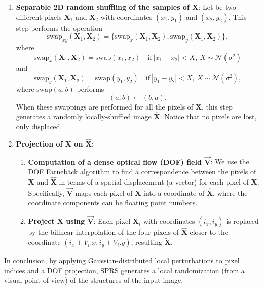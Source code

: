 \documentclass{article}
\begin{document}
\begin{enumerate}
\item \textbf{Separable 2D random shuffling of the samples of
    $\mathbf{X}$}: Let be two different pixels $\mathbf{X}_1$ and
  $\mathbf{X}_2$ with coordinates $(x_1, y_1)$ and $(x_2, y_2)$. This
  step performs the operation
  \begin{equation}
    \text{swap}_{xy}(\mathbf{X}_1,\mathbf{X}_2) = \{\text{swap}_x(\mathbf{X}_1,\mathbf{X}_2), \text{swap}_y(\mathbf{X}_1,\mathbf{X}_2)\},
  \end{equation}
  where
  \begin{equation}
    \text{swap}_x(\mathbf{X}_1,\mathbf{X}_2) = \text{swap}(x_1, x_2)\quad\text{if}~|x_1-x_2|<X,~X\sim\mathcal{N}(\sigma^2)
  \end{equation}
  and
  \begin{equation}
    \text{swap}_y(\mathbf{X}_1,\mathbf{X}_2) = \text{swap}(y_1, y_2)\quad\text{if}~|y_1-y_2|<X,~X\sim\mathcal{N}(\sigma^2),
  \end{equation}
  where $\text{swap}(a,b)$ performs
  \begin{equation}
    (a,b) \leftarrow (b,a).
  \end{equation}
  When these swappings are performed for all the pixels of
  $\mathbf{X}$, this step generates a randomly locally-shuffled image
  $\hat{\mathbf{X}}$. Notice that no pixels are lost, only displaced.

\item \textbf{Projection of $\mathbf{X}$ on $\hat{\mathbf{X}}$}:
  \begin{enumerate}
  \item \textbf{Computation of a dense optical flow (DOF) field
      $\overrightarrow{\mathbf{V}}$}: We use the DOF Farneb\"ack
    algorithm \cite{farneback2003two} to find a correspondence between
    the pixels of $\mathbf{X}$ and $\hat{\mathbf{X}}$ in terms of a
    spatial displacement (a vector) for each pixel of
    $\mathbf{X}$. Specifically, $\overrightarrow{\mathbf{V}}$ maps each
    pixel of $\mathbf{X}$ into a coordinate of $\hat{\mathbf{X}}$,
    where the coordinate components can be floating point numbers.
  \item \textbf{Project $\mathbf{X}$ using
      $\overrightarrow{\mathbf{V}}$}: Each pixel $\mathbf{X}_i$
    with coordinates $(i_x, i_y)$ is replaced by the bilinear
    interpolation of the four pixels of $\hat{\mathbf{X}}$ closer to
    the coordinate $(i_x+V_i.x,i_y+V_i.y)$, resulting
    $\tilde{\mathbf{X}}$.
  \end{enumerate}
\end{enumerate}

In conclusion, by applying Gaussian-distributed local perturbations to
pixel indices and a DOF projection, SPRS generates a local
randomization (from a visual point of view) of the structures of the
input image.





\end{document}
